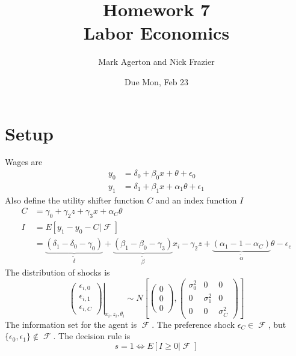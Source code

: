 \documentclass[11pt,letterpaper]{article}
\title{\textbf{Homework 7} \\ Labor Economics}
\author{Mark Agerton and Nick Frazier}
\date{Due Mon, Feb 23}
\DeclareMathOperator\F{\mathcal{F}}
\begin{document}
\maketitle

\section{Setup}
Wages are
\begin{align*}
y_0 &= \delta_0 + \beta_0 x + \theta + \epsilon_0 \\
y_1 &= \delta_1 + \beta_1 x + \alpha_1\theta + \epsilon_1
\end{align*}
Also define the utility shifter function $C$ and an index function $I$
\begin{align*}
C &= \gamma_0 + \gamma_2 z + \gamma_3 x + \alpha_C \theta  \\
I &= E[y_1 - y_0 - C|\F]  \\
  &= \underbrace{(\delta_1 - \delta_0 - \gamma_0)}_{\widetilde \delta} + \underbrace{(\beta_1 - \beta_0 - \gamma_3)}_{\widetilde \beta} x_i - \gamma_2 z + \underbrace{(\alpha_1 - 1- \alpha_C)}_{\widetilde \alpha} \theta - \epsilon_{c}
\end{align*}
The distribution of shocks is
\[
\left. \begin{pmatrix} \epsilon_{i,0} \\ \epsilon_{i,1} \\ \epsilon_{i,C} \end{pmatrix} \right|_{x_i,z_i,\theta_i}
\sim N
\left[ \begin{pmatrix} 0 \\ 0 \\ 0 \end{pmatrix}, \begin{pmatrix} \sigma_0^2& 0 & 0\\0& \sigma_1^2& 0 \\0 & 0& \sigma_C^2\end{pmatrix}	\right] 
\]
The information set for the agent is $\F$. The preference shock $\epsilon_C \in \F$, but $\{\epsilon_0,\epsilon_1\} \notin \F$. The decision rule is
\[
s = 1 \Longleftrightarrow E[I \geq 0 | \F]
\]
\end{document}
